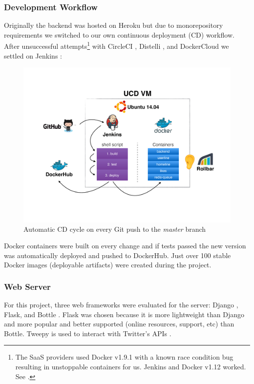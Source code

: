 \documentclass{article}
\begin{document}
\subsubsection*{Development Workflow} 
Originally the backend was hosted on Heroku \cite{heroku} but due to monorepository requirements \cite{ll-blog-week9} we switched to our own continuous deployment (CD) workflow. After unsuccessful attempts\footnote{The SaaS providers used Docker v1.9.1 with a known race condition bug resulting in unstoppable containers for us. Jenkins and Docker v1.12 worked. See \cite{ll-blog-week9}\cite{ll-blog-week10}\cite{ll-blog-week11}.} with CircleCI \cite{circleci}, Distelli \cite{distelli}, and DockerCloud \cite{dockercloud} we settled on Jenkins \cite{jenkins}:

\begin{figure}[H]
    \centering
    \includegraphics[width=\textwidth,trim={0 4cm 0 3.5cm},clip]{development_workflow}
    \caption{Automatic CD cycle on every Git push to the \textit{master} branch}
\end{figure}

\noindent Docker containers were built on every change and if tests passed the new version was automatically deployed and pushed to DockerHub. Just over 100 stable Docker images (deployable artifacts) were created during the project.

\subsubsection*{Web Server} 
For this project, three web frameworks were evaluated for the server: Django \cite{django}, Flask, and Bottle \cite{bottle}. Flask was chosen because it is more lightweight than Django and more popular and better supported (online resources, support, etc) than Bottle. Tweepy is used to interact with Twitter's APIs \cite{tweepy}.
\end{document}
